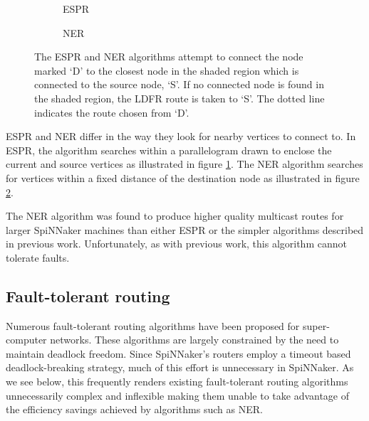 			\begin{figure}
				\center
				\begin{subfigure}{0.45\linewidth}
					\center
					
					\caption{ESPR}
					\label{fig:search-regions-espr}
				\end{subfigure}
				\begin{subfigure}{0.45\linewidth}
					\center
					
					\caption{NER}
					\label{fig:search-regions-ner}
				\end{subfigure}
				
				\caption{The ESPR and NER algorithms attempt to connect the node marked
				`D' to the closest node in the shaded region which is connected to the
				source node, `S'. If no connected node is found in the shaded region, the
				LDFR route is taken to `S'. The dotted line indicates the route chosen
				from `D'.}
				\label{fig:search-regions}
			\end{figure}
			
			ESPR and NER differ in the way they look for nearby vertices to connect
			to. In ESPR, the algorithm searches within a parallelogram drawn to
			enclose the current and source vertices as illustrated in figure
			\ref{fig:search-regions-espr}. The NER algorithm searches for vertices
			within a fixed distance of the destination node as illustrated in figure
			\ref{fig:search-regions-ner}.
			
			The NER algorithm was found to produce higher quality multicast routes
			for larger SpiNNaker machines than either ESPR or the simpler algorithms
			described in previous work. Unfortunately, as with previous work, this
			algorithm cannot tolerate faults.
			
		\subsection{Fault-tolerant routing}
			
			Numerous fault-tolerant routing algorithms have been proposed for
			super-computer networks. These algorithms are largely constrained by the
			need to maintain deadlock freedom. Since SpiNNaker's routers employ a
			timeout based deadlock-breaking strategy, much of this effort is
			unnecessary in SpiNNaker. As we see below, this frequently renders
			existing fault-tolerant routing algorithms unnecessarily complex and
			inflexible making them unable to take advantage of the efficiency savings
			achieved by algorithms such as NER.
			
